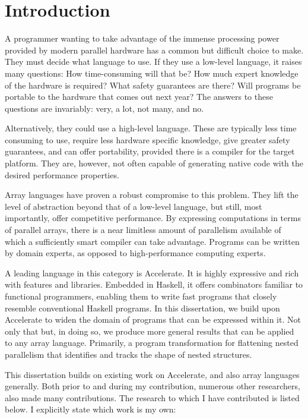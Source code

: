 \chapter{Introduction}

A programmer wanting to take advantage of the immense processing power provided by modern parallel hardware has a common but difficult choice to make. They must decide what language to use. If they use a low-level language, it raises many questions: How time-consuming will that be? How much expert knowledge of the hardware is required?  What safety guarantees are there? Will programs be portable to the hardware that comes out next year? The answers to these questions are invariably: very, a lot, not many, and no.

Alternatively, they could use a high-level language. These are typically less time consuming to use, require less hardware specific knowledge, give greater safety guarantees, and can offer portability, provided there is a compiler for the target platform. They are, however, not often capable of generating native code with the desired performance properties.

Array languages have proven a robust compromise to this problem. They lift the level of abstraction beyond that of a low-level language, but still, most importantly, offer competitive performance. By expressing computations in terms of parallel arrays, there is a near limitless amount of parallelism available of which a sufficiently smart compiler can take advantage. Programs can be written by domain experts, as opposed to high-performance computing experts.

A leading language in this category is Accelerate. It is highly expressive and rich with features and libraries. Embedded in Haskell, it offers combinators familiar to functional programmers, enabling them to write fast programs that closely resemble conventional Haskell programs. In this dissertation, we build upon Accelerate to widen the domain of programs that can be expressed within it. Not only that but, in doing so, we produce more general results that can be applied to any array language. Primarily, a program transformation for flattening nested parallelism that identifies and tracks the shape of nested structures.

This dissertation builds on existing work on Accelerate, and also array languages generally. Both prior to and during my contribution, numerous other researchers, also made many contributions. The research to which I have contributed is listed below. I explicitly state which work is my own:

